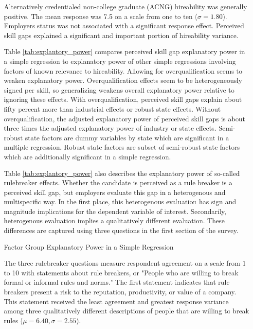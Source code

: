 \documentclass[review]{elsarticle}
\begin{document}

Alternatively credentialed non-college graduate (ACNG) hireability was generally positive.
The mean response was 7.5 on a scale from one to ten ($\sigma = 1.80$).
Employers status was not associated with a significant response effect.
Perceived skill gaps explained a significant and important portion of hireability variance.

Table \ref{tab:explantory_power} compares perceived skill gap explanatory power in a simple regression
to explanatory power of other simple regressions involving factors of known relevance to hireability.
Allowing for overqualification seems to weaken explanatory power.
Overqualification effects seem to be heterogeneously signed per skill, so generalizing weakens overall explanatory power relative to ignoring these effects.
With overqualification, perceived skill gaps explain about fifty percent more than industrial effects or robust state effects.
Without overqualification, the adjusted explanatory power of perceived skill gaps is about three times the adjusted explanatory power of industry or state effects.
Semi-robust state factors are dummy variables by state which are significant in a multiple regression.
Robust state factors are subset of semi-robust state factors which are additionally significant in a simple regression.

Table \ref{tab:explantory_power} also describes the explanatory power of so-called rulebreaker effects.
Whether the candidate is perceived as a rule breaker is a perceived skill gap, but employers evaluate this gap in a heterogenous and multispecific way.
In the first place, this heterogenous evaluation has sign and magnitude implications for the dependent variable of interest.
Secondarily, heterogenous evaluation implies a qualitatively different evaluation.
These differences are captured using three questions in the first section of the survey.

\begin{table}
    \caption{Factor Group Explanatory Power in a Simple Regression}
    \resizebox{\columnwidth}{!}{
        
    }
    \label{tab:explantory_power}
\end{table}

The three rulebreaker questions measure respondent agreement on a scale from 1 to 10 with statements about rule breakers, or "People who are willing to break formal or informal rules and norms."
The first statement indicates that rule breakers present a risk to the reputation, productivity, or value of a company.
This statement received the least agreement and greatest response variance among three qualitatively different descriptions of people that are willing to break rules ($\mu = 6.40, \sigma = 2.55$).
\end{document}
